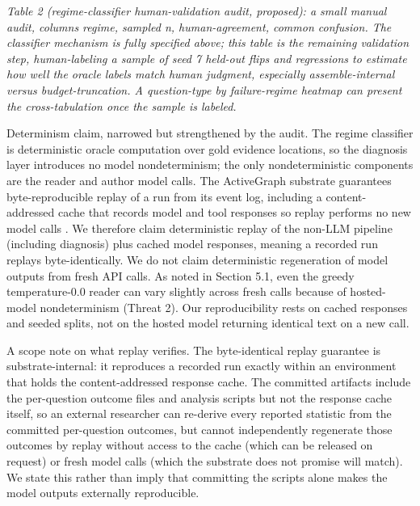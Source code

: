 \textit{Table 2 (regime-classifier human-validation audit, proposed): a small manual audit, columns regime, sampled n, human-agreement, common confusion. The classifier mechanism is fully specified above; this table is the remaining validation step, human-labeling a sample of seed 7 held-out flips and regressions to estimate how well the oracle labels match human judgment, especially assemble-internal versus budget-truncation. A question-type by failure-regime heatmap can present the cross-tabulation once the sample is labeled.}


Determinism claim, narrowed but strengthened by the audit. The regime classifier is deterministic oracle computation over gold evidence locations, so the diagnosis layer introduces no model nondeterminism; the only nondeterministic components are the reader and author model calls. The ActiveGraph substrate guarantees byte-reproducible replay of a run from its event log, including a content-addressed cache that records model and tool responses so replay performs no new model calls \citep{nakajima2026log}. We therefore claim deterministic replay of the non-LLM pipeline (including diagnosis) plus cached model responses, meaning a recorded run replays byte-identically. We do not claim deterministic regeneration of model outputs from fresh API calls. As noted in Section 5.1, even the greedy temperature-0.0 reader can vary slightly across fresh calls because of hosted-model nondeterminism (Threat 2). Our reproducibility rests on cached responses and seeded splits, not on the hosted model returning identical text on a new call.

A scope note on what replay verifies. The byte-identical replay guarantee is substrate-internal: it reproduces a recorded run exactly within an environment that holds the content-addressed response cache. The committed artifacts include the per-question outcome files and analysis scripts but not the response cache itself, so an external researcher can re-derive every reported statistic from the committed per-question outcomes, but cannot independently regenerate those outcomes by replay without access to the cache (which can be released on request) or fresh model calls (which the substrate does not promise will match). We state this rather than imply that committing the scripts alone makes the model outputs externally reproducible.

